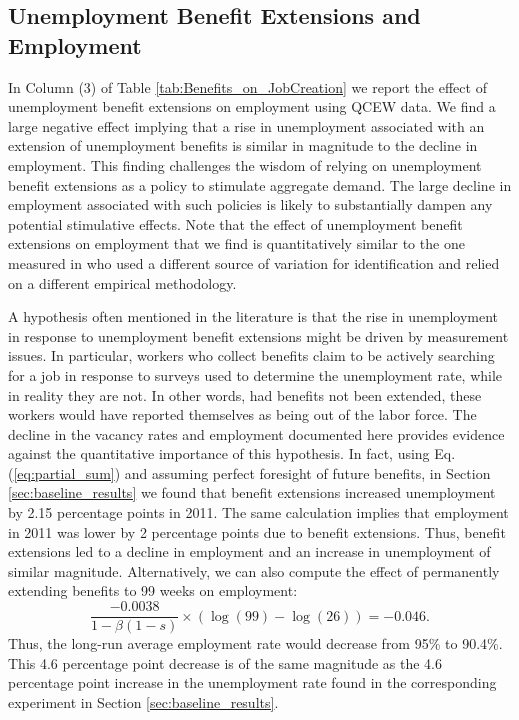 \documentclass[12pt]{article}
\newcommand{\1}{\mathbf{1}}
\begin{document}
\subsection{Unemployment Benefit Extensions and Employment}
\label{sec:UI_and_Emp}
In Column (3) of Table \ref{tab:Benefits_on_JobCreation} we report the effect of unemployment benefit extensions on employment using QCEW data. We find a large negative effect implying that a rise in unemployment associated with an extension of unemployment benefits is similar in magnitude to the decline in employment. This finding challenges the wisdom of relying on unemployment benefit extensions as a policy to stimulate aggregate demand. The large decline in employment associated with such policies is likely to substantially dampen any potential stimulative effects. Note that the effect of unemployment benefit extensions on employment that we find is quantitatively similar to the one measured in \citet{hagedorn+manovskii+mitman:15} who used a different source of variation for identification and relied on a different empirical methodology.


A hypothesis often mentioned in the literature is that the rise in unemployment in response to unemployment benefit extensions might be driven by measurement issues. In particular, workers who collect benefits claim to be actively searching for a job in response to surveys used to determine the unemployment rate, while in reality they are not. In other words, had benefits not been extended, these workers would have reported themselves as being out of the labor force. The decline in the vacancy rates and employment documented here provides evidence against the quantitative importance of this hypothesis.
In fact, using Eq. (\ref{eq:partial_sum}) and assuming perfect foresight of future benefits, in Section \ref{sec:baseline_results} we found that benefit extensions increased unemployment by 2.15 percentage points in 2011. The same calculation implies that employment in 2011 was lower by 2 percentage points due to benefit extensions. Thus, benefit extensions led to a decline in employment and an increase in unemployment of similar magnitude. Alternatively, we can also compute the effect  of permanently extending benefits to 99 weeks on employment:
\[
\frac{-0.0038}{1-\beta(1-s)}\times\left(\log(99)-\log(26)\right)=-0.046.
\]
Thus, the long-run average employment rate would decrease from 95\% to 90.4\%.  This 4.6 percentage point decrease is of the same magnitude as the 4.6 percentage point increase in the unemployment rate found in the corresponding experiment in Section \ref{sec:baseline_results}.
\end{document}
